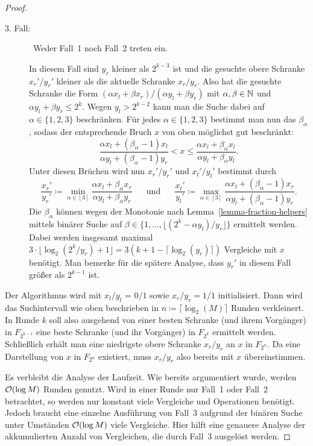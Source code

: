 \begin{proof}
\begin{description}
		\item[3. Fall:]~Weder Fall~1 noch Fall~2 treten ein.
		
			In diesem Fall sind $y_r$ kleiner als $2^{k-3}$ ist und die gesuchte obere Schranke $x_r'/y_r'$ kleiner als die aktuelle Schranke $x_r/y_r$.
			Also hat die gesuchte Schranke die Form $(\alpha x_l + \beta x_r)/(\alpha y_l + \beta y_r)$ mit $\alpha,\beta\in\mathbb{N}$ und $\alpha y_l + \beta y_r\leq 2^{k}$.
			Wegen $y_l > 2^{k-2}$ kann man die Suche dabei auf $\alpha \in \{ 1, 2, 3 \}$ beschränken.
			Für jedes $\alpha\in\{1,2,3\}$ bestimmt man nun das $\beta_\alpha$, sodass der entsprechende Bruch $x$ von oben möglichst gut beschränkt:
			\[
				\frac{\alpha x_l + (\beta_\alpha - 1) x_l}{\alpha y_l + (\beta_\alpha - 1) y_r} < x \leq \frac{\alpha x_l + \beta_\alpha x_l}{\alpha y_l + \beta_\alpha y_l}.
			\]
			Unter diesen Brüchen wird nun $x_r'/y_r'$ und $x_l'/y_l'$ bestimmt durch
			\[\frac{x_r'}{y_r'}\coloneq \min_{\alpha\in[3]} \frac{\alpha x_l + \beta_\alpha x_r}{\alpha y_l + \beta_\alpha y_r}
			\text{~~~~~und~~~~~}
			\frac{x_l'}{y_l'}\coloneq \max_{\alpha\in[3]} 			\frac{\alpha x_l + (\beta_\alpha - 1)x_r}{\alpha y_l + (\beta_\alpha - 1)y_r}.
			\]
			Die $\beta_\alpha$ können wegen der Monotonie nach Lemma~\ref{lemma-fraction-helpers} mittels binärer Suche auf $\beta \in \{1,\dots, \lfloor (2^{k} - \alpha y_l) / y_r \rfloor \}$ ermittelt werden.
			Dabei werden insgesamt maximal $3 \cdot \lfloor \log_2(2^{k} / y_r) + 1 \rfloor = 3 (k+1 - \lceil\log_2(y_r)\rceil)$ Vergleiche mit $x$ benötigt.
			Man bemerke für die spätere Analyse, dass $y_r'$ in diesem Fall größer als $2^{k-1}$ ist.
 	\end{description}
 	
 	Der Algorithmus wird mit $x_l/y_l$ = $0/1$ sowie $x_r/y_r = 1/1$ initialisiert.
 	Dann wird das Suchintervall wie oben beschrieben in $n\coloneq \lceil \log_2(M) \rceil$ Runden verkleinert.
 	In Runde $k$ soll also ausgehend von einer besten Schranke (und ihrem Vorgänger) in $F_{2^{k-1}}$ eine beste Schranke (und ihr Vorgänger) in $F_{2^{k}}$ ermittelt werden.
 	Schließlich erhält man eine niedrigste obere Schranke $x_r/y_r$ an $x$ in $F_{2^n}$.
 	Da eine Darstellung von $x$ in $F_{2^n}$ existiert, muss $x_r/y_r$ also bereits mit $x$ übereinstimmen.
 	
 	Es verbleibt die Analyse der Laufzeit.
 	Wie bereits argumentiert wurde, werden $\mathcal{O}(\log M)$ Runden genutzt.
 	Wird in einer Runde nur Fall~1 oder Fall~2 betrachtet, so werden nur konstant viele Vergleiche und Operationen benötigt.
 	Jedoch braucht eine einzelne Ausführung von Fall~3 aufgrund der binären Suche unter Umständen $\mathcal{O}(\log M)$ viele Vergleiche.
 	Hier hilft eine genauere Analyse der akkumulierten Anzahl von Vergleichen, die durch Fall~3 ausgelöst werden.
 	

\end{proof}
